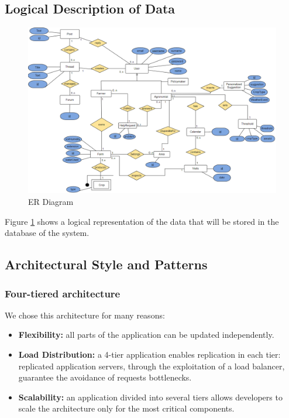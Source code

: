 \subsection{Logical Description of Data}
\begin{figure}[H]
    \includegraphics[width=\textwidth,height=\textheight,keepaspectratio]{Images/erDiagram.png}
    \caption{ER Diagram}
    \label{fig:er_diagram}
\end{figure}
Figure \ref{fig:er_diagram} shows a logical representation of the data that will be stored in the database of the system.


\bigskip
\subsection{Architectural Style and Patterns}
\subsubsection{Four-tiered architecture}
We chose this architecture for many reasons:
\begin{itemize}
    \item \textbf{Flexibility:} all parts of the application can be updated independently.
    \item \textbf{Load Distribution:} a 4-tier application enables replication in each tier: replicated application servers, through the exploitation of
    a load balancer, guarantee the avoidance of requests bottlenecks.
    \item \textbf{Scalability:} an application divided into several tiers allows developers to scale the architecture only for the most critical components.
\end{itemize}

